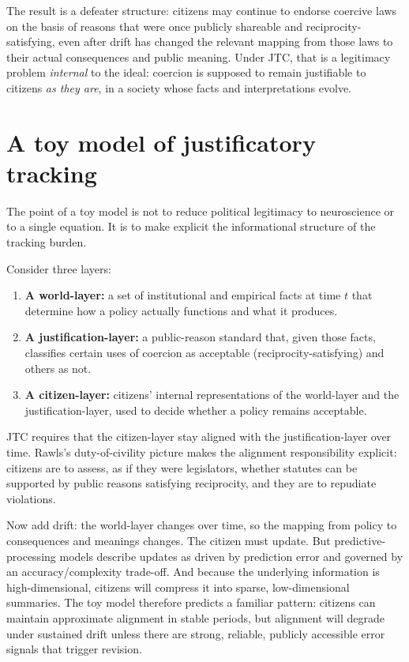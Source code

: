 \documentclass[12pt]{report}
\begin{document}
The result is a defeater structure: citizens may continue to endorse coercive laws on the basis of reasons that were once publicly shareable and reciprocity-satisfying, even after drift has changed the relevant mapping from those laws to their actual consequences and public meaning. Under JTC, that is a legitimacy problem \emph{internal} to the ideal: coercion is supposed to remain justifiable to citizens \emph{as they are}, in a society whose facts and interpretations evolve.

\section{A toy model of justificatory tracking}
\label{sec:toy-model}

The point of a toy model is not to reduce political legitimacy to neuroscience or to a single equation. It is to make explicit the informational structure of the tracking burden.

Consider three layers:

\begin{enumerate}[leftmargin=*, itemsep=0.4em]
    \item \textbf{A world-layer:} a set of institutional and empirical facts at time $t$ that determine how a policy actually functions and what it produces.
    \item \textbf{A justification-layer:} a public-reason standard that, given those facts, classifies certain uses of coercion as acceptable (reciprocity-satisfying) and others as not.
    \item \textbf{A citizen-layer:} citizens' internal representations of the world-layer and the justification-layer, used to decide whether a policy remains acceptable.
\end{enumerate}

JTC requires that the citizen-layer stay aligned with the justification-layer over time. Rawls's duty-of-civility picture makes the alignment responsibility explicit: citizens are to assess, as if they were legislators, whether statutes can be supported by public reasons satisfying reciprocity, and they are to repudiate violations. \parencite[p.~444]{rawls2005political}

Now add drift: the world-layer changes over time, so the mapping from policy to consequences and meanings changes. The citizen must update. But predictive-processing models describe updates as driven by prediction error and governed by an accuracy/complexity trade-off. \parencite[p.~128]{friston2010freeenergy} And because the underlying information is high-dimensional, citizens will compress it into sparse, low-dimensional summaries. \parencite[pp.~491--492]{ganguli2012compressed} The toy model therefore predicts a familiar pattern: citizens can maintain approximate alignment in stable periods, but alignment will degrade under sustained drift unless there are strong, reliable, publicly accessible error signals that trigger revision.
\end{document}
